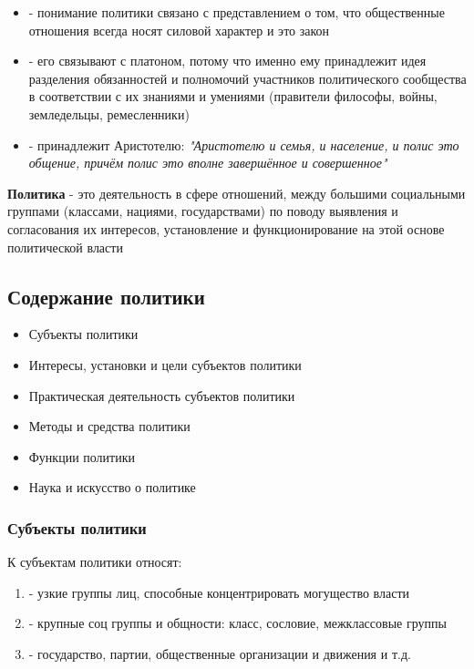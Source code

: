 \begin{itemize}
      \item {} - понимание политики связано с
            представлением о том, что общественные отношения всегда носят силовой
            характер и это закон
      \item {} - его связывают с платоном, потому что именно
            ему принадлежит идея разделения обязанностей и полномочий участников
            политического сообщества в соответствии с их знаниями и умениями (правители
            философы, войны, земледельцы, ремесленники)
      \item {} - принадлежит Аристотелю: \textit{"Аристотелю
                  и семья, и население, и полис это общение, причём полис это вполне
                  завершённое и совершенное"}
\end{itemize}

\textbf{Политика} - это деятельность в сфере отношений, между большими социальными
группами (классами, нациями, государствами) по поводу выявления и согласования их
интересов, установление и функционирование на этой основе политической власти

\subsection{Содержание политики}

\begin{itemize}
      \item Субъекты политики
      \item Интересы, установки и цели субъектов политики
      \item Практическая деятельность субъектов политики
      \item Методы и средства политики
      \item Функции политики
      \item Наука и искусство о политике
\end{itemize}

\subsubsection{Субъекты политики}

К субъектам политики относят:
\begin{enumerate}
      \item {} - узкие группы лиц, способные
            концентрировать могущество власти
      \item {} - крупные соц группы и общности: класс,
            сословие, межклассовые группы
      \item {} - государство, партии, общественные
            организации и движения и т.д.
\end{enumerate}

